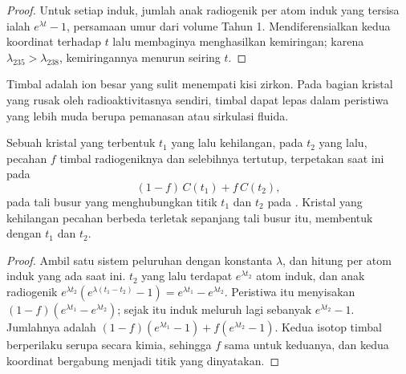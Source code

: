 \begin{proof}
Untuk setiap induk, jumlah anak radiogenik per atom induk yang tersisa ialah
$e^{\lambda t} - 1$, persamaan umur dari volume Tahun 1. Mendiferensialkan
kedua koordinat terhadap $t$ lalu membaginya menghasilkan kemiringan; karena
$\lambda_{235} > \lambda_{238}$, kemiringannya menurun seiring $t$.
\end{proof}

Timbal adalah ion besar yang sulit menempati kisi zirkon. Pada bagian kristal
yang rusak oleh radioaktivitasnya sendiri, timbal dapat lepas dalam peristiwa yang
lebih muda berupa pemanasan atau sirkulasi fluida.

\begin{theorem}\label{thm:b3:advanced-geochronology:discordia}
Sebuah kristal yang terbentuk $t_1$ yang lalu kehilangan, pada $t_2$ yang lalu, pecahan $f$
timbal radiogeniknya dan selebihnya tertutup, terpetakan saat ini pada
\[
(1 - f)\,C(t_1) + f\,C(t_2),
\]
pada tali busur yang menghubungkan titik $t_1$ dan $t_2$ pada . Kristal yang
kehilangan pecahan berbeda terletak sepanjang tali busur itu, membentuk  dengan
 $t_1$ dan  $t_2$.
\end{theorem}

\begin{proof}
Ambil satu sistem peluruhan dengan konstanta $\lambda$, dan hitung per atom induk
yang ada saat ini. $t_2$ yang lalu terdapat $e^{\lambda t_2}$ atom induk, dan
anak radiogenik $e^{\lambda t_2}(e^{\lambda(t_1 - t_2)} - 1) =
e^{\lambda t_1} - e^{\lambda t_2}$. Peristiwa itu menyisakan $(1 - f)(e^{\lambda t_1} -
e^{\lambda t_2})$; sejak itu induk meluruh lagi sebanyak $e^{\lambda t_2} - 1$. Jumlahnya
adalah $(1 - f)(e^{\lambda t_1} - 1) + f(e^{\lambda t_2} - 1)$. Kedua isotop timbal
berperilaku serupa secara kimia, sehingga $f$ sama untuk keduanya, dan kedua koordinat
bergabung menjadi titik yang dinyatakan.
\end{proof}

